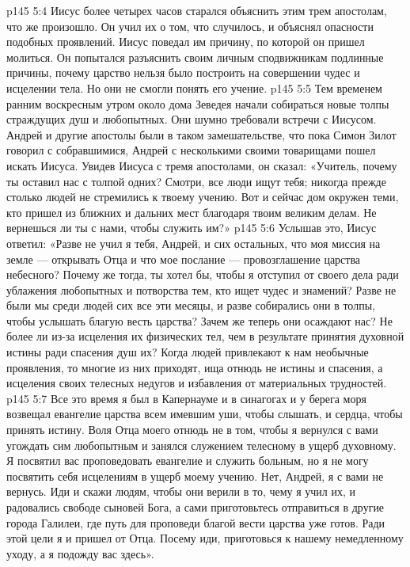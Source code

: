 \vs p145 5:4 Иисус более четырех часов старался объяснить этим трем апостолам, что же произошло. Он учил их о том, что случилось, и объяснял опасности подобных проявлений. Иисус поведал им причину, по которой он пришел молиться. Он попытался разъяснить своим личным сподвижникам подлинные причины, почему царство нельзя было построить на совершении чудес и исцелении тела. Но они не смогли понять его учение.
\vs p145 5:5 Тем временем ранним воскресным утром около дома Зеведея начали собираться новые толпы страждущих душ и любопытных. Они шумно требовали встречи с Иисусом. Андрей и другие апостолы были в таком замешательстве, что пока Симон Зилот говорил с собравшимися, Андрей с несколькими своими товарищами пошел искать Иисуса. Увидев Иисуса с тремя апостолами, он сказал: «Учитель, почему ты оставил нас с толпой одних? Смотри, все люди ищут тебя; никогда прежде столько людей не стремились к твоему учению. Вот и сейчас дом окружен теми, кто пришел из ближних и дальних мест благодаря твоим великим делам. Не вернешься ли ты с нами, чтобы служить им?»
\vs p145 5:6 Услышав это, Иисус ответил: «Разве не учил я тебя, Андрей, и сих остальных, что моя миссия на земле --- открывать Отца и что мое послание --- провозглашение царства небесного? Почему же тогда, ты хотел бы, чтобы я отступил от своего дела ради ублажения любопытных и потворства тем, кто ищет чудес и знамений? Разве не были мы среди людей сих все эти месяцы, и разве собирались они в толпы, чтобы услышать благую весть царства? Зачем же теперь они осаждают нас? Не более ли из\hyp{}за исцеления их физических тел, чем в результате принятия духовной истины ради спасения душ их? Когда людей привлекают к нам необычные проявления, то многие из них приходят, ища отнюдь не истины и спасения, а исцеления своих телесных недугов и избавления от материальных трудностей.
\vs p145 5:7 Все это время я был в Капернауме и в синагогах и у берега моря возвещал евангелие царства всем имевшим уши, чтобы слышать, и сердца, чтобы принять истину. Воля Отца моего отнюдь не в том, чтобы я вернулся с вами угождать сим любопытным и занялся служением телесному в ущерб духовному. Я посвятил вас проповедовать евангелие и служить больным, но я не могу посвятить себя исцелениям в ущерб моему учению. Нет, Андрей, я с вами не вернусь. Иди и скажи людям, чтобы они верили в то, чему я учил их, и радовались свободе сыновей Бога, а сами приготовьтесь отправиться в другие города Галилеи, где путь для проповеди благой вести царства уже готов. Ради этой цели я и пришел от Отца. Посему иди, приготовься к нашему немедленному уходу, а я подожду вас здесь».
